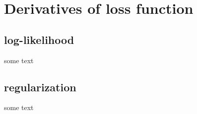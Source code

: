 \documentclass{article}
\begin{document}
	\section{Derivatives of loss function}
	
		\subsection{log-likelihood}
		
		some text
		
		\subsection{regularization}
		
		some text
	
%	
%	
%	
	
\end{document}
